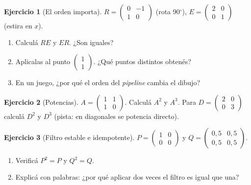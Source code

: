 \documentclass[a4paper,12pt]{article}
\theoremstyle{definition}
\newtheorem{ejercicio}{Ejercicio}[section]
\begin{document}
\begin{ejercicio}[El orden importa]
$R=\begin{pmatrix} 0 & -1 \\ 1 & 0 \end{pmatrix}$ (rota 90$^\circ$), $E=\begin{pmatrix} 2 & 0 \\ 0 & 1 \end{pmatrix}$ (estira en $x$).
\begin{enumerate}[label=\alph*)]
\item Calculá $RE$ y $ER$. ¿Son iguales?
\item Aplicalas al punto $\begin{pmatrix} 1 \\ 1 \end{pmatrix}$. ¿Qué puntos distintos obtenés?
\item En un juego, ¿por qué el orden del \textit{pipeline} cambia el dibujo?
\end{enumerate}
\end{ejercicio}

\begin{ejercicio}[Potencias]
$A=\begin{pmatrix} 1 & 1 \\ 1 & 0 \end{pmatrix}$. Calculá $A^2$ y $A^3$. Para $D=\begin{pmatrix} 2 & 0 \\ 0 & 3 \end{pmatrix}$ calculá $D^2$ y $D^3$ (pista: en diagonales se potencia directo).
\end{ejercicio}

\begin{ejercicio}[Filtro estable e idempotente]
$P=\begin{pmatrix} 1 & 0 \\ 0 & 0 \end{pmatrix}$ y $Q=\begin{pmatrix} 0{,}5 & 0{,}5 \\ 0{,}5 & 0{,}5 \end{pmatrix}$.
\begin{enumerate}[label=\alph*)]
\item Verificá $P^2=P$ y $Q^2=Q$.
\item Explicá con palabras: ¿por qué aplicar dos veces el filtro es igual que una?
\end{enumerate}
\end{ejercicio}

\end{document}
